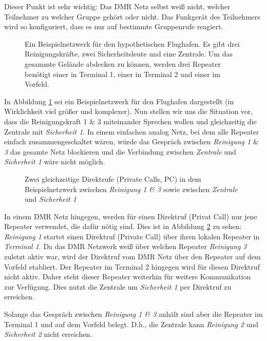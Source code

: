 \begin{merke}
 Dieser Punkt ist sehr wichtig: Das DMR Netz selbst weiß nicht, welcher Teilnehmer zu welcher Gruppe gehört oder nicht. Das Funkgerät des Teilnehmers wird so konfiguriert, dass es nur auf bestimmte Gruppenrufe reagiert.
\end{merke}

\begin{figure}[!ht]
 \centering
 
 \caption{Ein Beispielnetzwerk für den hypothetischen Flughafen. Es gibt drei Reinigungskräfte, zwei Sicherheitsleute und eine Zentrale. Um das gesammte Gelände abdecken zu können, werden drei Repeater benötigt einer in Terminal 1, einer in Terminal 2 und einer im Vorfeld.} \label{fig:exnet1}
\end{figure}

In Abbildung \ref{fig:exnet1} sei ein Beispielnetzwerk für den Flughafen dargestellt (in Wirklichkeit viel größer und komplexer). Nun stellen wir uns die Situation vor, dass die Reinigungskraft 1 \& 3 miteinander Sprechen wollen und gleichzeitig die Zentrale mit \emph{Sicherheit 1}. In einem einfachen analog Netz, bei dem alle Repeater einfach zusammengeschaltet wären, würde das Gespräch zwischen \emph{Reinigung 1} \& \emph{3} das gesamte Netz blockieren und die Verbindung zwischen \emph{Zentrale} und \emph{Sicherheit 1} wäre nicht möglich. 

\begin{figure}[!ht]
 \centering
 
 \caption{Zwei gleichzeitige Direktrufe (Private Calls, PC) in dem Beispielnetzwerk zwischen \emph{Reinigung 1 \& 3} sowie zwischen \emph{Zentrale} und \emph{Sicherheit 1}} \label{fig:exnet2}
\end{figure}

In einem DMR Netz hingegen, werden für einen Direktruf (Privat Call) nur jene Repeater verwendet, die dafür nötig sind. Dies ist in Abbildung \ref{fig:exnet2} zu sehen: \emph{Reinigung 1} startet einen Direktruf (Private Call) über ihren lokalen Repeater in \emph{Terminal 1}. Da das DMR Netzwerk weiß über welchen Repeater \emph{Reinigung 3} zuletzt aktiv war, wird der Direktruf vom DMR Netz über den Repeater auf dem Vorfeld etabliert. Der Repeater im Terminal 2 hingegen wird für diesen Direktruf nicht aktiv. Daher steht dieser Repeater weiterhin für weitere Kommunikation zur Verfügung. Dies nutzt die Zentrale um \emph{Sicherheit 1} per Direktruf zu erreichen. 

Solange das Gespräch zwischen \emph{Reinigung 1 \& 3} anhält sind aber die Repeater im Terminal 1 und auf dem Vorfeld belegt. D.h., die Zentrale kann \emph{Reinigung 2} und \emph{Sicherheit 2} nicht erreichen. 

